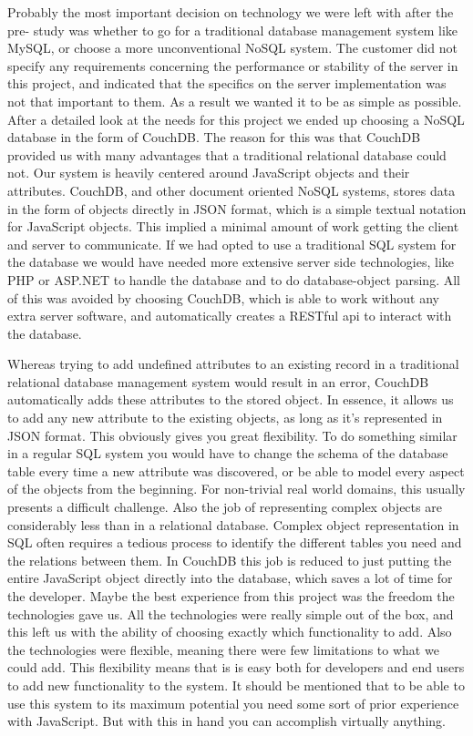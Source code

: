 Probably the most important decision on technology we were left with after the pre- study was whether to go for a traditional database management system like MySQL, or choose a more unconventional NoSQL system. The customer did not specify any requirements concerning the performance or stability of the server in this project, and indicated that the specifics on the server implementation was not that important to them. As a result we wanted it to be as simple as possible. After a detailed look at the needs for this project we ended up choosing a NoSQL database in the form of CouchDB. The reason for this was that CouchDB provided us with many advantages that a traditional relational database could not. Our system is heavily centered around JavaScript objects and their attributes. CouchDB, and other document oriented NoSQL systems, stores data in the form of objects directly in JSON format, which is a simple textual notation for JavaScript objects. This implied a minimal amount of work getting the client and server to communicate. If we had opted to use a traditional SQL system for the database we would have needed more extensive server side technologies, like PHP or ASP.NET to handle the database and to do database-object parsing. All of this was avoided by choosing CouchDB, which is able to work without any extra server software, and automatically creates a RESTful api to interact with the database. 

Whereas trying to add undefined attributes to an existing record in a traditional relational database management system would result in an error, CouchDB automatically adds these attributes to the stored object. In essence, it allows us to add any new attribute to the existing objects, as long as it's represented in JSON format. This obviously gives you great flexibility. To do something similar in a regular SQL system you would have to change the schema of the database table every time a new attribute was discovered, or be able to model every aspect of the objects from the beginning. For non-trivial real world domains, this usually presents a difficult challenge. Also the job of representing complex objects are considerably less than in a relational database. Complex object representation in SQL often requires a tedious process to identify the different tables you need and the relations between them. In CouchDB this job is reduced to just putting the entire JavaScript object directly into the database, which saves a lot of time for the developer. Maybe the best experience from this project was the freedom the technologies gave us. All the technologies were really simple out of the box, and this left us with the ability of choosing exactly which functionality to add. Also the technologies were flexible, meaning there were few limitations to what we could add. This flexibility means that is is easy both for developers and end users to add new functionality to the system. It should be mentioned that to be able to use this system to its maximum potential you need some sort of prior experience with JavaScript. But with this in hand you can accomplish virtually anything.

